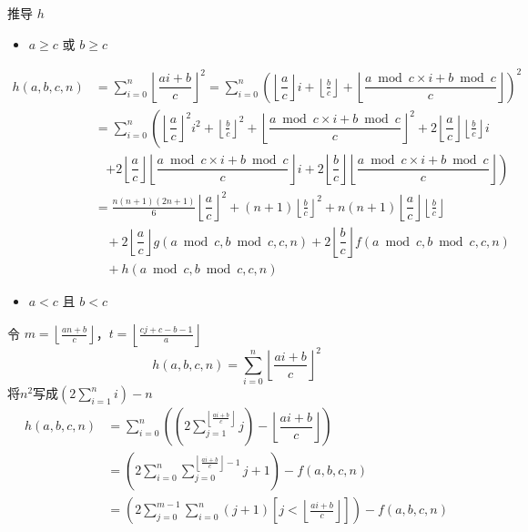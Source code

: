 \documentclass[UTF8]{beamer}
\begin{document}
    \begin{frame}{推导 $h$}
        \begin{itemize}
            \item $a\ge c$ 或 $b\ge c$
        \end{itemize}
        $$
        \begin{aligned}
        h(a,b,c,n)&=\sum_{i=0}^n \left\lfloor \dfrac{ai+b}{c}\right\rfloor^2=\sum_{i=0}^n\left(\left\lfloor\dfrac{a}{c}\right\rfloor i+\left\lfloor\frac{b}{c}\right\rfloor +\left\lfloor \dfrac{a\bmod c\times i+b\bmod c}{c}\right\rfloor\right)^2 \\
        &=\sum_{i=0}^n\left(\left\lfloor\dfrac{a}{c}\right\rfloor^2 i^2+\left\lfloor\frac{b}{c}\right\rfloor^2 +\left\lfloor \dfrac{a \bmod  c\times i+b\bmod  c}{c}\right\rfloor^2+2\left\lfloor\dfrac{a}{c}\right\rfloor\left\lfloor\frac{b}{c}\right\rfloor i\right.\\
        &\ \ \ \ \left.+2\left\lfloor\dfrac{a}{c}\right\rfloor\left\lfloor \dfrac{a\bmod  c\times i+b\bmod  c}{c}\right\rfloor i+2\left\lfloor\dfrac{b}{c}\right\rfloor\left\lfloor \dfrac{a\bmod  c\times i+b\bmod  c}{c}\right\rfloor\right)\\
        &=\frac{n(n+1)(2n+1)}{6}\left\lfloor\dfrac{a}{c}\right\rfloor^2+(n+1)\left\lfloor\frac{b}{c}\right\rfloor^2+n(n+1)\left\lfloor\dfrac{a}{c}\right\rfloor\left\lfloor\frac{b}{c}\right\rfloor\\
        &\ \ \ \ +2\left\lfloor\dfrac{a}{c}\right\rfloor g(a\bmod  c,b\bmod c,c,n)+2\left\lfloor\dfrac{b}{c}\right\rfloor f(a\bmod c,b\bmod c,c,n)\\
        &\ \ \ \ +h(a\bmod c,b\bmod c,c,n)
        \end{aligned}
        $$
    \end{frame}

    \begin{frame}
        \begin{itemize}
            \item $a<c$ 且 $b<c$
        \end{itemize}
        令 $m=\left\lfloor\frac{an+b}{c}\right\rfloor$，$t=\left\lfloor\frac{cj+c-b-1}{a}\right\rfloor$
$$
h(a,b,c,n)=\sum_{i=0}^n \left\lfloor \dfrac{ai+b}{c}\right\rfloor^2
$$
将$n^2$写成$\left(2\sum_{i=1}^n i\right)-n$
$$
\begin{aligned}
h(a,b,c,n)&=\sum_{i=0}^n\left(\left(2\sum_{j=1}^{\left\lfloor \frac{ai+b}{c}\right\rfloor}j\right)-\left\lfloor \dfrac{ai+b}{c}\right\rfloor\right)\\
&=\left(2\sum_{i=0}^n\sum_{j=0}^{\left\lfloor \frac{ai+b}{c}\right\rfloor-1}j+1\right)-f(a,b,c,n)\\
&=\left(2\sum_{j=0}^{m-1}\sum_{i=0}^n (j+1)\left[j< \left\lfloor \frac{ai+b}{c}\right\rfloor\right]\right)-f(a,b,c,n)
\end{aligned}
$$
    \end{frame}
\end{document}
